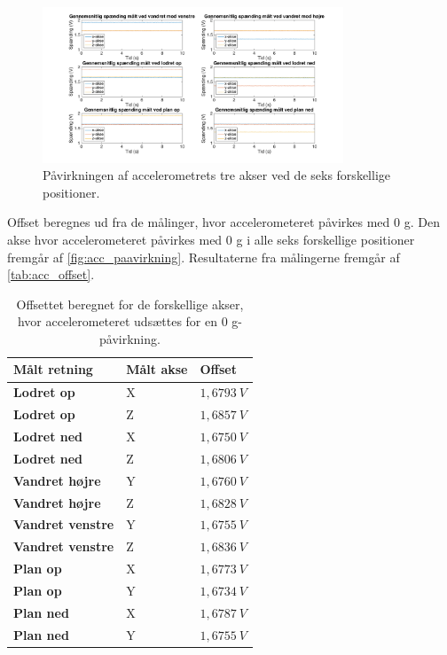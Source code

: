 \begin{figure}[H]
\centering
\includegraphics[width=0.8\textwidth]{figures/paavirkning}
\caption{Påvirkningen af accelerometrets tre akser ved de seks forskellige positioner.}
\label{fig:acc_paavirkning2}
\end{figure}

Offset beregnes ud fra de målinger, hvor accelerometeret påvirkes med 0 g. Den akse hvor accelerometeret påvirkes med 0 g i alle seks forskellige positioner fremgår af \autoref{fig:acc_paavirkning}. Resultaterne fra målingerne fremgår af \autoref{tab:acc_offset}. 

\begin{table}[H]
	\centering
	\begin{tabular}{|l|l|l|}
	\textbf{Målt retning} & \textbf{Målt akse} & \textbf{Offset} \\ \hline
    \textbf{Lodret op} 		& X 		& $1,6793~V$ 	\\ \hline
    \textbf{Lodret op} 		& Z 		& $1,6857~V$ 	 \\ \hline
    \textbf{Lodret ned}		& X 		& $1,6750~V$ 	\\ \hline
    \textbf{Lodret ned}		& Z 		& $1,6806~V$  	\\ \hline
    \textbf{Vandret højre} 	& Y 		& $1,6760~V$    \\ \hline     
    \textbf{Vandret højre} 	& Z 		& $1,6828~V$ 	\\ \hline
    \textbf{Vandret venstre}	& Y 		& $1,6755~V$ 	\\ \hline
    \textbf{Vandret venstre}	& Z 		& $1,6836~V$		\\ \hline
    \textbf{Plan op} 		& X 		& $1,6773~V$		\\ \hline		
    \textbf{Plan op} 		& Y 		& $1,6734~V$    \\ \hline
    \textbf{Plan ned} 		& X 		& $1,6787~V$		\\ \hline
    \textbf{Plan ned} 		& Y 		& $1,6755~V$		\\ \hline
	\end{tabular}
	\caption{Offsettet beregnet for de forskellige akser, hvor accelerometeret udsættes for en 0 g-påvirkning.}
	\label{tab:acc_offset}
\end{table}

